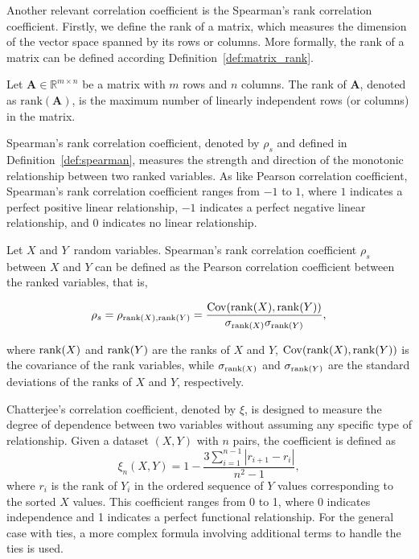 Another relevant correlation coefficient is the Spearman's rank correlation coefficient. Firstly, we define the rank of a matrix, which measures the dimension of the vector space spanned by its rows or columns. More formally, the rank of a matrix can be defined according Definition~\ref{def:matrix_rank}.

\begin{definition} \label{def:matrix_rank}
Let $\mathbf{A} \in \mathbb{R}^{m \times n}$ be a matrix with $m$ rows and $n$ columns. The rank of $\mathbf{A}$, denoted as $\text{rank}(\mathbf{A})$, is the maximum number of linearly independent rows (or columns) in the matrix.
\end{definition}

Spearman's rank correlation coefficient, denoted by $\rho_s$ and defined in Definition~\ref{def:spearman}, measures the strength and direction of the monotonic relationship between two ranked variables.  As like Pearson correlation coefficient, Spearman's rank correlation coefficient ranges from $-1$ to $1$, where $1$ indicates a perfect positive linear relationship, $-1$ indicates a perfect negative linear relationship, and $0$ indicates no linear relationship.
 
\begin{definition}\label{def:spearman}
Let  $X$ and $Y$\ random variables. Spearman's rank correlation coefficient  $\rho_s$ between $X$ and $Y$ can be defined as the Pearson correlation coefficient between the ranked variables, that is, 

\begin{equation}\label{eq:spearman}
\rho_s = \rho_{\operatorname{rank}(X),\operatorname{rank}(Y)} = \frac{\mathrm{Cov}(\operatorname{rank}(X), \operatorname{rank}(Y))}{\sigma_{\operatorname{rank}(X)} \sigma_{\operatorname{rank}(Y)}},
\end{equation}

where $\operatorname{rank}(X)$ and $\operatorname{rank}(Y)$ are the ranks of $X$ and $Y$, $\mathrm{Cov}(\operatorname{rank}(X), \operatorname{rank}(Y))$ is the covariance of the rank variables, while $\sigma_{\operatorname{rank}(X)}$ and $\sigma_{\operatorname{rank}(Y)}$ are the standard deviations of the ranks of $X$ and $Y$, respectively.
\end{definition}

Chatterjee's correlation coefficient, denoted by $\xi$, is designed to measure the degree of dependence between two variables without assuming any specific type of relationship. Given a dataset $(X, Y)$ with $n$ pairs, the coefficient is defined as
\begin{equation}
\xi_n(X,Y) = 1 - \frac{3 \sum_{i=1}^{n-1} |r_{i+1} - r_i|}{n^2 - 1},
\end{equation}
where $r_i$ is the rank of $Y_i$ in the ordered sequence of $Y$ values corresponding to the sorted $X$ values. This coefficient ranges from 0 to 1, where 0 indicates independence and 1 indicates a perfect functional relationship. For the general case with ties, a more complex formula involving additional terms to handle the ties is used.

